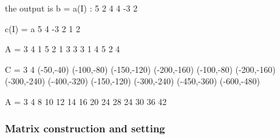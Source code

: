 \documentclass[a4paper,twoside,12pt]{book}
\def\setS#1{#1\label{sec:#1}}
\begin{document}
\eFF

 the output is
 \bFF
 b = a(I) : 5
          2       4       4      -3       2

  c(I) = a 5
          4      -3       2       1       2

 A = 3 4
           1   5   2   1
           3   3   3   1
           4   5   2   4

 C = 3 4
         (-50,-40) (-100,-80) (-150,-120) (-200,-160)
         (-100,-80) (-200,-160) (-300,-240) (-400,-320)
         (-150,-120) (-300,-240) (-450,-360) (-600,-480)

 A = 3 4
           8  10  12  14
          16  20  24  28
          24  30  36  42
\eFF

\subsubsection{\setS{Matrix  construction and setting}}
\end{document}
